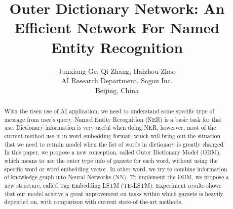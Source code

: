 \documentclass[letterpaper]{article} %
\title{ Outer Dictionary Network: An Efficient Network For Named Entity Recognition }
\author{Junxiang Ge, Qi Zhang, Haizhou Zhao\\ 
AI Research Department, Sogou Inc. \\
Beijing, China}
\begin{document}
\maketitle

\begin{abstract}
With the risen use of AI application, we need to understand some specific type of message from user's query. Named Entity Recognition (NER) is a basic task for that use. Dictionary information is very useful when doing NER, howerver, most of the current method use it in word embedding format, which will bring out the situation that we need to retrain model when the list of words in dictionary is greatly changed. In this paper, we propose a new conception, called Outer Dictionary Model (ODM), which means to use the outer type info of gazzete for each word, without using the specific word or word embedding vector. In other word, we try to combine information of knowledge graph into Neural Networks (NN). To implement the ODM, we propose a new structure, called Tag Embedding LSTM (TE-LSTM). Experiment results shows that our model acheive a great improvement on tasks within which gazzete is heavily depended on, with comparison with current state-of-the-art methods. 
\end{abstract}
\end{document}
